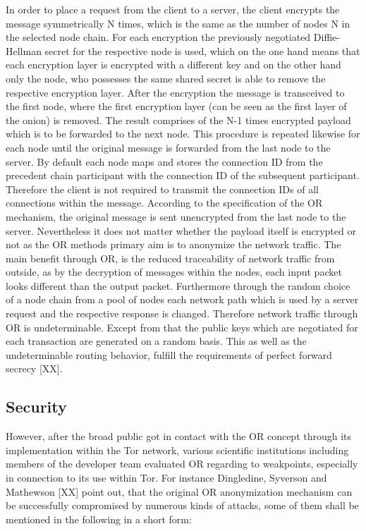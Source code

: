 \documentclass{sig-alternate}
\begin{document}
In order to place a request from the client to a server, the client encrypts the message symmetrically N times, which is the same as the number of nodes N in the selected node chain. For each encryption the previously negotiated Diffie-Hellman secret for the respective node is used, which on the one hand means that each encryption layer is encrypted with a different key and on the other hand only the node, who possesses the same shared secret is able to remove the respective encryption layer. 
After the encryption the message is transceived to the first node, where the first encryption layer (can be seen as the first layer of the onion) is removed. The result comprises of the N-1 times encrypted payload which is to be forwarded to the next node. This procedure is repeated likewise for each node until the original message is forwarded from the last node to the server. By default each node maps and stores the connection ID from the precedent chain participant with the connection ID of the subsequent participant. Therefore the client is not required to transmit the connection IDs of all connections within the message. According to the specification of the OR mechanism, the original message is sent unencrypted from the last node to the server. Nevertheless it does not matter whether the payload itself is encrypted or not as the OR methods primary aim is to anonymize the network traffic.  
The main benefit through OR, is the reduced traceability of network traffic from outside, as by the decryption of messages within the nodes, each input packet looks different than the output packet. Furthermore through the random choice of a node chain from a pool of nodes each network path which is used by a server request and the respective response is changed. Therefore network traffic through OR is undeterminable. Except from that the public keys which are negotiated for each transaction are generated on a random basis. This as well as the undeterminable routing behavior, fulfill the requirements of perfect forward secrecy [XX].  

\subsection{Security}

However, after the broad public got in contact with the OR concept through its implementation within the Tor network, various scientific institutions including members of the developer team evaluated OR regarding to weakpoints, especially in connection to its use within Tor. For instance Dingledine, Syverson and Mathewson [XX] point out, that the original OR anonymization mechanism can be successfully compromised by numerous kinds of attacks, some of them shall be mentioned in the following in a short form:
\end{document}
